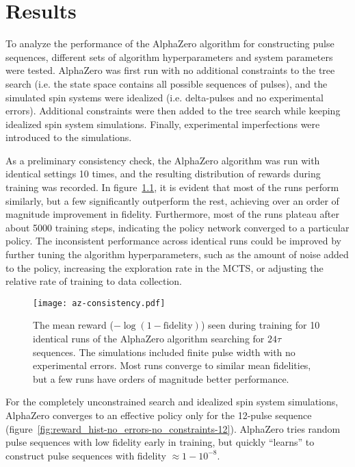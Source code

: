 \chapter{Results}

To analyze the performance of the AlphaZero algorithm for constructing pulse sequences, different sets of algorithm hyperparameters and system parameters were tested. AlphaZero was first run with no additional constraints to the tree search (i.e. the state space contains all possible sequences of pulses), and the simulated spin systems were idealized (i.e. delta-pulses and no experimental errors). Additional constraints were then added to the tree search while keeping idealized spin system simulations. Finally, experimental imperfections were introduced to the simulations.



As a preliminary consistency check, the AlphaZero algorithm was run with identical settings 10 times, and the resulting distribution of rewards during training was recorded. In figure~\ref{fig:az-consistency}, it is evident that most of the runs perform similarly, but a few significantly outperform the rest, achieving over an order of magnitude improvement in fidelity. Furthermore, most of the runs plateau after about 5000 training steps, indicating the policy network converged to a particular policy. The inconsistent performance across identical runs could be improved by further tuning the algorithm hyperparameters, such as the amount of noise added to the policy, increasing the exploration rate in the MCTS, or adjusting the relative rate of training to data collection.

\begin{figure}[H]
    \centering
    \texttt{[image: az-consistency.pdf]}
    \caption{The mean reward ($-\log(1-\text{fidelity})$) seen during training for 10 identical runs of the AlphaZero algorithm searching for $24\tau$ sequences. The simulations included finite pulse width with no experimental errors. Most runs converge to similar mean fidelities, but a few runs have orders of magnitude better performance.}
    \label{fig:az-consistency}
\end{figure}


For the completely unconstrained search and idealized spin system simulations, AlphaZero converges to an effective
policy only for the 12-pulse sequence (figure~\ref{fig:reward_hist-no_errors-no_constraints-12}). AlphaZero tries random pulse sequences with low fidelity early in training, but quickly ``learns'' to construct pulse sequences with fidelity $\approx 1 - 10^{-8}$.

